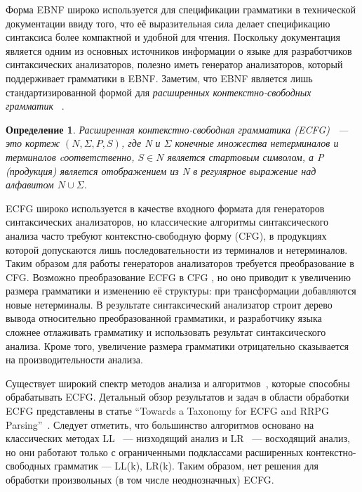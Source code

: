\documentclass[14pt]{matmex-diploma-custom}
\newtheorem{mydef}{Определение}
\begin{document}
	Форма EBNF широко используется для спецификации грамматики в технической документации
	ввиду того, что её выразительная сила делает спецификацию синтаксиса более компактной
	и удобной для чтения. Поскольку документация является одним из основных источников информации
	о языке для разработчиков синтаксических анализаторов, полезно иметь генератор
	анализаторов, который поддерживает грамматики в EBNF. Заметим, что EBNF является 
	лишь стандартизированной формой для \textit{расширенных контекстно-свободных грамматик}
	~\cite{ECFG}.
	
	\begin{mydef}
		Расширенная контекстно-свободная грамматика (ECFG)~\cite{ECFG} --- это кортеж $(N, \Sigma, P, S)$,
		где N и $\Sigma$ конечные множества нетерминалов и терминалов cоответственно, 
		$S\in N$ является стартовым символом, а P (продукция) является отображением из N в
		регулярное выражение над алфавитом $N \cup \Sigma$.
		
	\end{mydef}
	ECFG широко используется в качестве входного формата для генераторов синтаксических анализаторов, 
	но классические алгоритмы синтаксического анализа часто требуют контекстно-свободную форму (CFG),
	в продукциях которой допускаются лишь последовательности из терминалов и нетерминалов. Таким образом 
	для работы генераторов анализаторов требуется преобразование в CFG.
	Возможно преобразование ECFG в CFG \cite{ELL}, но оно приводит к увеличению
	размера грамматики и изменению её структуры: при трансформации добавляются новые
	нетерминалы. В результате синтаксический анализатор строит дерево вывода относительно
	преобразованной грамматики, и разработчику языка сложнее отлаживать грамматику 
	и использовать результат синтаксического анализа. Кроме того, увеличение размера грамматики 
    отрицательно сказывается на производительности анализа.
    
	Существует широкий спектр методов анализа и алгоритмов~\cite{AttributedELL,ELRR,
		ECFGparsing,ELLParser,ELL,ECFG,ELALR,ELRParsing}, которые способны обрабатывать 
	ECFG. Детальный обзор результатов и задач в области обработки ECFG 
	представлены в статье ``Towards a Taxonomy for ECFG and RRPG Parsing''~\cite{ECFG}.
	Следует отметить, что большинство алгоритмов основано на классических методах
	LL~\cite{ELLParser,AttributedELL,PredictiveECFG} --- низходящий анализ и LR~\cite{ELRParsing,ELALR,ELRR}
    --- восходящий анализ,
	но они работают только с ограниченными подклассами расширенных контекстно-свободных грамматик ---
    LL(k), LR(k). Таким образом, нет решения 
	для обработки произвольных (в том числе неоднозначных) ECFG.
	
\end{document}
